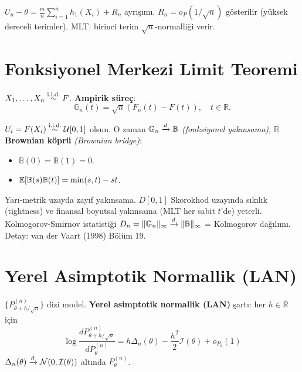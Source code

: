 \begin{ispatiskele}
$U_n - \theta = \frac{m}{n}\sum_{i=1}^n h_1(X_i) + R_n$ ayrışımı. $R_n = o_P(1/\sqrt{n})$ gösterilir (yüksek dereceli terimler). MLT: birinci terim $\sqrt{n}$-normalliği verir.
\end{ispatiskele}

\section{Fonksiyonel Merkezi Limit Teoremi}
\label{sec:fonksiyonel_mlt}

\begin{tanim}\label{def:ampirik_surec}
$X_1,\ldots,X_n\overset{\text{i.i.d.}}{\sim} F$. \textbf{Ampirik süreç}:
\[
  \mathbb{G}_n(t) = \sqrt{n}(F_n(t) - F(t)), \quad t\in\mathbb{R}.
\]
\end{tanim}

\begin{teorem}[Donsker]\label{thm:donsker}
$U_i = F(X_i)\overset{\text{i.i.d.}}{\sim}\mathcal{U}[0,1]$ olsun. O zaman $\mathbb{G}_n \xrightarrow{d} \mathbb{B}$ \emph{(fonksiyonel yakınsama)}, $\mathbb{B}$ \textbf{Brownian köprü} \emph{(Brownian bridge)}:
\begin{itemize}
  \item $\mathbb{B}(0)=\mathbb{B}(1)=0$.
  \item $\mathbb{E}[\mathbb{B}(s)\mathbb{B}(t)] = \min(s,t) - st$.
\end{itemize}
\end{teorem}

\begin{ispatiskele}
Yarı-metrik uzayda zayıf yakınsama. $D[0,1]$ Skorokhod uzayında sıkılık (tightness) ve finansal boyutsal yakınsama (MLT her sabit $t$'de) yeterli. Kolmogorov-Smirnov istatistiği $D_n=\|\mathbb{G}_n\|_\infty\xrightarrow{d}\|\mathbb{B}\|_\infty$ = Kolmogorov dağılımı. Detay: van der Vaart (1998) Bölüm 19.
\end{ispatiskele}

\section{Yerel Asimptotik Normallik (LAN)}
\label{sec:lan}

\begin{tanim}\label{def:lan}
$\{P_{\theta+h/\sqrt{n}}^{(n)}\}$ dizi model. \textbf{Yerel asimptotik normallik (LAN)} şartı: her $h\in\mathbb{R}$ için
\[
  \log\frac{dP_{\theta+h/\sqrt{n}}^{(n)}}{dP_\theta^{(n)}} = h\Delta_n(\theta) - \frac{h^2}{2}\mathcal{I}(\theta) + o_{P_\theta}(1)
\]
$\Delta_n(\theta)\xrightarrow{d}\mathcal{N}(0,\mathcal{I}(\theta))$ altında $P_\theta^{(n)}$.
\end{tanim}

